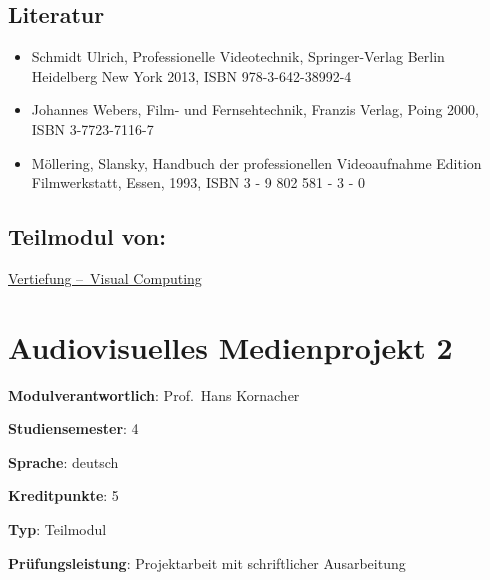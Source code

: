 \hypertarget{literaturpathlabelmi-2017modulbeschreibungen-bachelorba_vc-audiovisuelle-medientechnik}{%
\section*{Literatur\label{/mi-2017/modulbeschreibungen-bachelor/BA_VC-audiovisuelle-medientechnik}}\label{literaturpathlabelmi-2017modulbeschreibungen-bachelorba_vc-audiovisuelle-medientechnik}}

\begin{itemize}
\tightlist
\item
  Schmidt Ulrich, Professionelle Videotechnik, Springer-Verlag Berlin
  Heidelberg New York 2013, ISBN 978-3-642-38992-4
\item
  Johannes Webers, Film- und Fernsehtechnik, Franzis Verlag, Poing 2000,
  ISBN 3-7723-7116-7
\item
  Möllering, Slansky, Handbuch der professionellen Videoaufnahme Edition
  Filmwerkstatt, Essen, 1993, ISBN 3 - 9 802 581 - 3 - 0
\end{itemize}

\hypertarget{teilmodul-vonpathlabelmi-2017modulbeschreibungen-bachelorba_vc-audiovisuelle-medientechnik}{%
\section*{Teilmodul
von:\label{/mi-2017/modulbeschreibungen-bachelor/BA_VC-audiovisuelle-medientechnik}}\label{teilmodul-vonpathlabelmi-2017modulbeschreibungen-bachelorba_vc-audiovisuelle-medientechnik}}

\hyperref[/mi-2017/modulbeschreibungen-bachelor/BA_Vertiefung-Visual-Computing]{Vertiefung – Visual Computing}

\hypertarget{audiovisuelles-medienprojekt-2pathlabelmi-2017modulbeschreibungen-bachelorba_vc-audiovisuelles-medienprojekt-2}{%
\chapter{Audiovisuelles Medienprojekt
2\label{/mi-2017/modulbeschreibungen-bachelor/BA_VC-audiovisuelles-medienprojekt-2}}\label{audiovisuelles-medienprojekt-2pathlabelmi-2017modulbeschreibungen-bachelorba_vc-audiovisuelles-medienprojekt-2}}

\begin{modulHead}
\textbf{Modulverantwortlich}: Prof.~Hans
Kornacher
\end{modulHead}
\begin{modulHead}
\textbf{Studiensemester}:
4
\end{modulHead}
\begin{modulHead}
\textbf{Sprache}:
deutsch
\end{modulHead}
\begin{modulHead}
\textbf{Kreditpunkte}:
5
\end{modulHead}
\begin{modulHead}
\textbf{Typ}:
Teilmodul
\end{modulHead}
\begin{modulHead}
\textbf{Prüfungsleistung}:
Projektarbeit mit schriftlicher Ausarbeitung
\end{modulHead}


